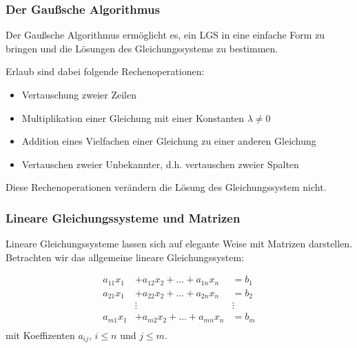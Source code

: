 \documentclass{beamer}
\begin{document}
\begin{frame}
  \frametitle{Der Gaußsche Algorithmus}
  
  Der Gaußsche Algorithmus ermöglicht es, ein LGS in eine einfache Form zu bringen und die Lösungen des Gleichungssystems zu bestimmen.
  \vspace{0.3cm}
  
  Erlaub sind dabei folgende Rechenoperationen:
  
  \begin{itemize}
    \item Vertauschung zweier Zeilen
    \item Multiplikation einer Gleichung mit einer Konstanten $\lambda \neq 0$
    \item Addition eines Vielfachen einer Gleichung zu einer anderen Gleichung
    \item Vertauschen zweier Unbekannter, d.h. vertauschen zweier Spalten
  \end{itemize}
  
  \vspace{0.3cm}
  Diese Rechenoperationen verändern die Lösung des Gleichungssystem nicht.  
\end{frame}

\begin{frame}
  \frametitle{Lineare Gleichungssysteme und Matrizen}
  
  Lineare Gleichungssysteme lassen sich auf elegante Weise mit Matrizen darstellen. Betrachten wir das allgemeine lineare Gleichungssystem:
  
    \begin{align*}
    a_{11}x_1 &+ a_{12}x_2 + \ldots + a_{1n}x_n &= b_1 \\
    a_{21}x_1 &+ a_{22}x_2 + \ldots + a_{2n}x_n &= b_2 \\
   &\vdots   &\vdots \\
    a_{m1}x_1 &+ a_{m2}x_2 + \ldots + a_{mn}x_n &= b_m \\
  \end{align*}
  mit Koeffizenten $a_{ij}$, $i\leq n$ und $j\leq m$.
\end{frame}
\end{document}
